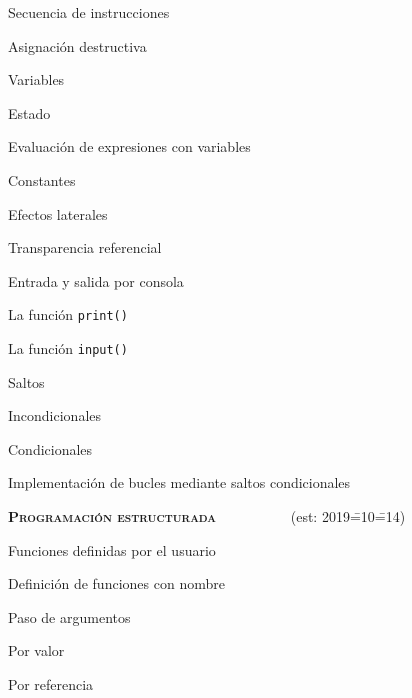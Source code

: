 \begin{longenum}
\begin{longenum}
\begin{longenum}
            \item Secuencia de instrucciones
        \end{longenum}
        \item Asignación destructiva
        \begin{longenum}
            \item Variables
            \item Estado
            \item Evaluación de expresiones con variables
            \item Constantes
        \end{longenum}
        \item Efectos laterales
        \begin{longenum}
            \item Transparencia referencial
            \item Entrada y salida por consola
            \begin{longenum}
                \item La función \texttt{print()}
                \item La función \texttt{input()}
            \end{longenum}
        \end{longenum}
        \item Saltos
        \begin{longenum}
            \item Incondicionales
            \item Condicionales
            \item Implementación de bucles mediante saltos condicionales
        \end{longenum}
    \end{longenum}
    \item \textbf{\textsc{Programación estructurada}} \ \ \ \ \ \ \ \ \ \ (est: 2019\==10\==14)
    \begin{longenum}
        \item Funciones definidas por el usuario
        \begin{longenum}
            \item Definición de funciones con nombre
            \item Paso de argumentos
            \begin{longenum}
                \item Por valor
                \item Por referencia

\end{longenum}
\end{longenum}
\end{longenum}
\end{longenum}
